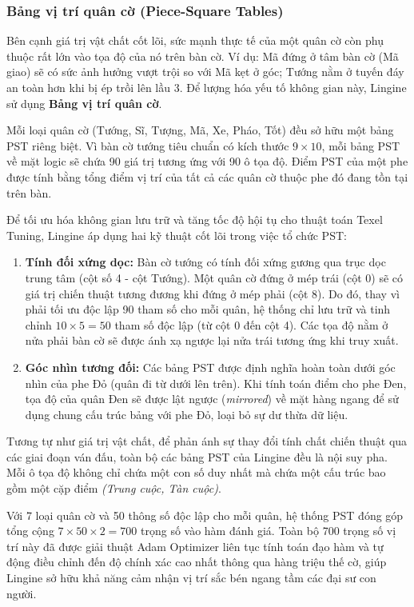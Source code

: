 \subsubsection{Bảng vị trí quân cờ (Piece-Square Tables)}

Bên cạnh giá trị vật chất cốt lõi, sức mạnh thực tế của một quân cờ còn phụ thuộc rất lớn vào tọa độ của nó trên bàn cờ. Ví dụ: Mã đứng ở tâm bàn cờ (Mã giao) sẽ có sức ảnh hưởng vượt trội so với Mã kẹt ở góc; Tướng nằm ở tuyến đáy an toàn hơn khi bị ép trồi lên lầu 3. Để lượng hóa yếu tố không gian này, Lingine sử dụng \textbf{Bảng vị trí quân cờ}.

Mỗi loại quân cờ (Tướng, Sĩ, Tượng, Mã, Xe, Pháo, Tốt) đều sở hữu một bảng PST riêng biệt. Vì bàn cờ tướng tiêu chuẩn có kích thước $9 \times 10$, mỗi bảng PST về mặt logic sẽ chứa 90 giá trị tương ứng với 90 ô tọa độ. Điểm PST của một phe được tính bằng tổng điểm vị trí của tất cả các quân cờ thuộc phe đó đang tồn tại trên bàn.

Để tối ưu hóa không gian lưu trữ và tăng tốc độ hội tụ cho thuật toán Texel Tuning, Lingine áp dụng hai kỹ thuật cốt lõi trong việc tổ chức PST:

\begin{enumerate}
    \item \textbf{Tính đối xứng dọc:} Bàn cờ tướng có tính đối xứng gương qua trục dọc trung tâm (cột số 4 - cột Tướng). Một quân cờ đứng ở mép trái (cột 0) sẽ có giá trị chiến thuật tương đương khi đứng ở mép phải (cột 8). Do đó, thay vì phải tối ưu độc lập 90 tham số cho mỗi quân, hệ thống chỉ lưu trữ và tinh chỉnh $10 \times 5 = 50$ tham số độc lập (từ cột 0 đến cột 4). Các tọa độ nằm ở nửa phải bàn cờ sẽ được ánh xạ ngược lại nửa trái tương ứng khi truy xuất.
    \item \textbf{Góc nhìn tương đối:} Các bảng PST được định nghĩa hoàn toàn dưới góc nhìn của phe Đỏ (quân đi từ dưới lên trên). Khi tính toán điểm cho phe Đen, tọa độ của quân Đen sẽ được lật ngược (\textit{mirrored}) về mặt hàng ngang để sử dụng chung cấu trúc bảng với phe Đỏ, loại bỏ sự dư thừa dữ liệu.
\end{enumerate}

Tương tự như giá trị vật chất, để phản ánh sự thay đổi tính chất chiến thuật qua các giai đoạn ván đấu, toàn bộ các bảng PST của Lingine đều là nội suy pha. Mỗi ô tọa độ không chỉ chứa một con số duy nhất mà chứa một cấu trúc bao gồm một cặp điểm \textit{(Trung cuộc, Tàn cuộc)}. 

Với 7 loại quân cờ và 50 thông số độc lập cho mỗi quân, hệ thống PST đóng góp tổng cộng $7 \times 50 \times 2 = 700$ trọng số vào hàm đánh giá. Toàn bộ 700 trọng số vị trí này đã được giải thuật Adam Optimizer liên tục tính toán đạo hàm và tự động điều chỉnh đến độ chính xác cao nhất thông qua hàng triệu thế cờ, giúp Lingine sở hữu khả năng cảm nhận vị trí sắc bén ngang tầm các đại sư con người.

